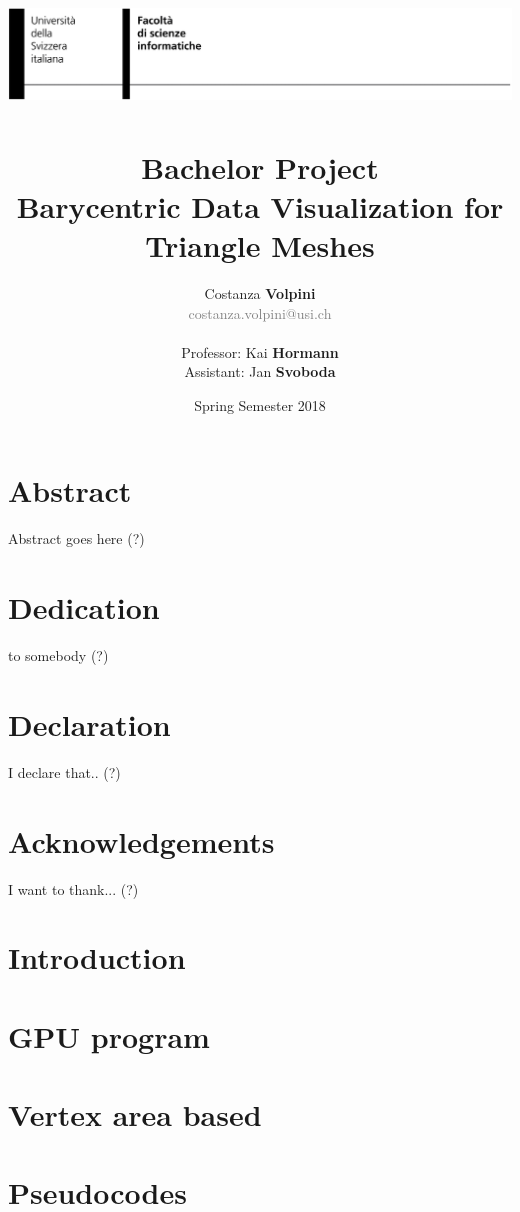 \documentclass[12pt, a4paper]{report}
\title{\vspace{-8.0cm}\includegraphics[width=\linewidth]{header.png}~
\\[0.5cm]
  \huge{Bachelor Project} \\
\textbf{\Large{Barycentric Data Visualization for Triangle Meshes}}}
\date{Spring Semester 2018}
\author{Costanza \textbf{Volpini} \\ \textcolor{gray}{costanza.volpini@usi.ch} \\ \\ Professor: Kai \textbf{Hormann} \\ Assistant: Jan \textbf{Svoboda}}
\begin{document}
\maketitle

\chapter*{Abstract}
Abstract goes here (?)

\chapter*{Dedication}
to somebody (?)

\chapter*{Declaration}
I declare that.. (?)

\chapter*{Acknowledgements}
I want to thank... (?)

\tableofcontents

\chapter{Introduction}


\chapter{GPU program}


\chapter{Vertex area based}



% 






\appendix
\chapter{Pseudocodes}

\end{document}
